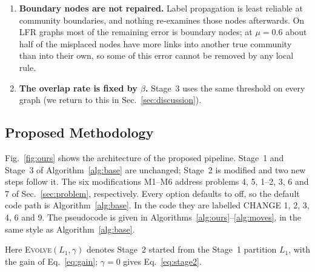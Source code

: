 \documentclass[conference]{IEEEtran}
\begin{document}
\begin{enumerate}
\item \textbf{Boundary nodes are not repaired.} Label propagation is least reliable at community boundaries, and nothing re-examines those nodes afterwards. On LFR graphs most of the remaining error is boundary nodes; at $\mu=0.6$ about half of the misplaced nodes have more links into another true community than into their own, so some of this error cannot be removed by any local rule.
\item \textbf{The overlap rate is fixed by $\beta$.} Stage~3 uses the same threshold on every graph (we return to this in Sec.~\ref{sec:discussion}).
\end{enumerate}

\subsection{Proposed Methodology}\label{sec:arch}
Fig.~\ref{fig:ours} shows the architecture of the proposed pipeline. Stage~1 and Stage~3 of Algorithm~\ref{alg:base} are unchanged; Stage~2 is modified and two new steps follow it. The six modifications M1--M6 address problems 4, 5, 1--2, 3, 6 and 7 of Sec.~\ref{sec:problem}, respectively. Every option defaults to off, so the default code path is Algorithm~\ref{alg:base}. In the code they are labelled CHANGE 1, 2, 3, 4, 6 and 9. The pseudocode is given in Algorithms~\ref{alg:ours}--\ref{alg:moves}, in the same style as Algorithm~\ref{alg:base}.

\noindent Here \textsc{Evolve}$(L_1,\gamma)$ denotes Stage~2 started from the Stage~1 partition $L_1$, with the gain of Eq.~\eqref{eq:gain}; $\gamma=0$ gives Eq.~\eqref{eq:stage2}.
\end{document}

